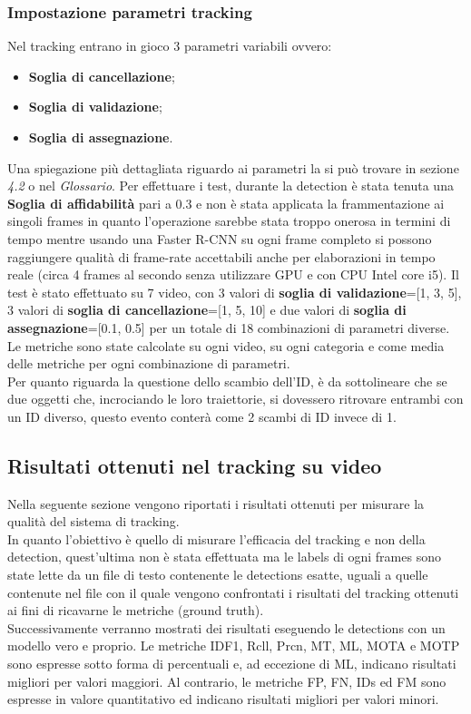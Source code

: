 \subsubsection{Impostazione parametri tracking}
Nel tracking entrano in gioco 3 parametri variabili ovvero:
\begin{itemize}
\item \textbf{Soglia di cancellazione};
\item \textbf{Soglia di validazione};
\item \textbf{Soglia di assegnazione}.
\end{itemize}
Una spiegazione più dettagliata riguardo ai parametri la si può trovare in sezione \textit{4.2} o nel \textit{Glossario}.
Per effettuare i test, durante la detection è stata tenuta una \textbf{Soglia di affidabilità} pari a 0.3 e non è stata applicata la frammentazione ai singoli frames in quanto l'operazione sarebbe stata troppo onerosa in termini di tempo mentre usando una Faster R-CNN su ogni frame completo si possono raggiungere qualità di frame-rate accettabili anche per elaborazioni in tempo reale (circa 4 frames al secondo senza utilizzare GPU e con CPU Intel core i5).
Il test è stato effettuato su 7 video, con 3 valori di \textbf{soglia di validazione}=[1, 3, 5], 3 valori di \textbf{soglia di cancellazione}=[1, 5, 10] e due valori di \textbf{soglia di assegnazione}=[0.1, 0.5] per un totale di 18 combinazioni di parametri diverse. Le metriche sono state calcolate su ogni video, su ogni categoria e come media delle metriche per ogni combinazione di parametri.\\
Per quanto riguarda la questione dello scambio dell'ID, è da sottolineare che se due oggetti che, incrociando le loro traiettorie, si dovessero ritrovare entrambi con un ID diverso, questo evento conterà come 2 scambi di ID invece di 1.

\subsection{Risultati ottenuti nel tracking su video}
Nella seguente sezione vengono riportati i risultati ottenuti per misurare la qualità del sistema di tracking.\\
In quanto l'obiettivo è quello di misurare l'efficacia del tracking e non della detection, quest'ultima non è stata effettuata ma le labels di ogni frames sono state lette da un file di testo contenente le detections esatte, uguali a quelle contenute nel file con il quale vengono confrontati i risultati del tracking ottenuti ai fini di ricavarne le metriche (ground truth).\\
Successivamente verranno mostrati dei risultati eseguendo le detections con un modello vero e proprio. Le metriche IDF1, Rcll, Prcn, MT, ML, MOTA e MOTP sono espresse sotto forma di percentuali e, ad eccezione di ML, indicano risultati migliori per valori maggiori. Al contrario, le metriche FP, FN, IDs ed FM sono espresse in valore quantitativo ed indicano risultati migliori per valori minori.

